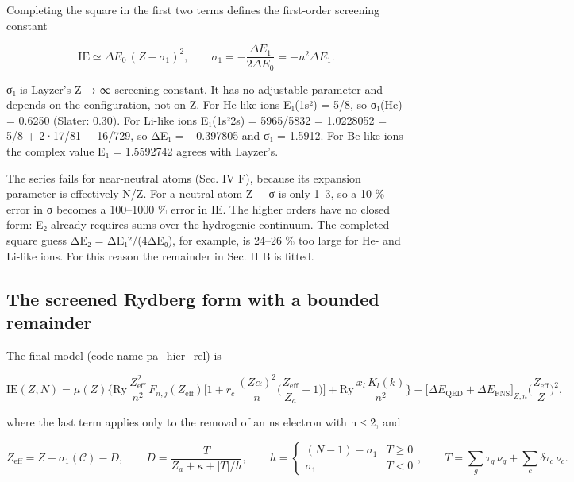 \documentclass[aps,pra,preprint,superscriptaddress,amsmath,amssymb]{revtex4-2}
\begin{document}
Completing the square in the first two terms defines the first-order screening constant


\begin{equation}
\mathrm{IE}\simeq \Delta E_0\,(Z-\sigma_1)^2,\qquad \sigma_1=-\frac{\Delta E_1}{2\Delta E_0}=-n^2\Delta E_1 .
\end{equation}

σ₁ is Layzer's Z → ∞ screening constant. It has no adjustable parameter and depends on the configuration, not on Z. For He-like ions E₁(1s²) = 5/8, so σ₁(He) = 0.6250 (Slater: 0.30). For Li-like ions E₁(1s²2s) = 5965/5832 = 1.0228052 = 5/8 + 2·17/81 − 16/729, so ΔE₁ = −0.397805 and σ₁ = 1.5912. For Be-like ions the complex value E₁ = 1.5592742 agrees with Layzer's.


The series fails for near-neutral atoms (Sec. IV F), because its expansion parameter is effectively N/Z. For a neutral atom Z − σ is only 1–3, so a 10 \% error in σ becomes a 100–1000 \% error in IE. The higher orders have no closed form: E₂ already requires sums over the hydrogenic continuum. The completed-square guess ΔE₂ = ΔE₁²/(4ΔE₀), for example, is 24–26 \% too large for He- and Li-like ions. For this reason the remainder in Sec. II B is fitted.


\subsection{The screened Rydberg form with a bounded remainder}

The final model (code name pa\_hier\_rel) is


\begin{equation}
\mathrm{IE}(Z,N)=\mu(Z)\Big\{\mathrm{Ry}\,\frac{Z_\mathrm{eff}^2}{n^2}\,F_{n,j}(Z_\mathrm{eff})\Big[1+r_c\,\frac{(Z\alpha)^2}{n}\Big(\frac{Z_\mathrm{eff}}{Z_a}-1\Big)\Big]+\mathrm{Ry}\,\frac{x_l\,K_l(k)}{n^2}\Big\}-\big[\Delta E_\mathrm{QED}+\Delta E_\mathrm{FNS}\big]_{Z,n}\Big(\frac{Z_\mathrm{eff}}{Z}\Big)^2 ,
\end{equation}

where the last term applies only to the removal of an ns electron with n ≤ 2, and


\begin{equation}
Z_\mathrm{eff}=Z-\sigma_1(\mathcal C)-D,\qquad
D=\frac{T}{Z_a+\kappa+|T|/h},\qquad
h=\begin{cases}(N-1)-\sigma_1 & T\ge 0\\ \sigma_1 & T<0\end{cases},\qquad
T=\sum_{g}\tau_g\,\nu_g+\sum_{c}\delta\tau_c\,\nu_c .
\end{equation}
\end{document}
